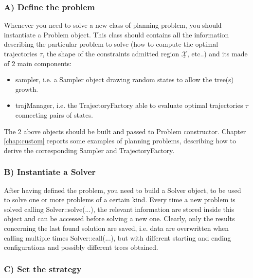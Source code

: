 \subsubsection{A) Define the problem}

Whenever you need to solve a new class of planning problem, you should instantiate a Problem object.
This class should contains all the information describing the particular problem to solve (how to compute the optimal trajectories $\tau$, the shape of the constraints admitted region $\underline{\mathcal{X}}$, etc..) and its made of 2 main components:
\begin{itemize}
\item sampler, i.e. a Sampler object drawing random states to allow the tree(s) growth.
\item trajManager, i.e. the TrajectoryFactory able to evaluate optimal trajectories $\tau$ connecting pairs of states.
\end{itemize}
The 2 above objects should be built and passed to Problem constructor. 
Chapter \ref{chap:custom} reports some examples of planning problems, describing how to derive the corresponding Sampler and TrajectoryFactory.

\subsubsection{B) Instantiate a Solver}

After having defined the problem, you need to build a Solver object, to be used to solve one or more problems of a certain kind.
Every time a new problem is solved calling Solver::solve(...), the relevant information are stored inside this object and can be accessed before solving a new one.
Clearly, only the results concerning the last found solution are saved, i.e. data are overwritten when calling multiple times Solver::call(...), but with different starting and ending configurations and possibly different trees obtained.

\subsubsection{C) Set the strategy}

